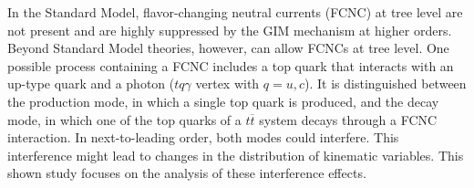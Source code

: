 \documentclass{scdpg}
\begin{document}
\begin{scAbstract}
{}
\scBeginText
In the Standard Model, flavor-changing neutral currents (FCNC) at tree level are not present and are highly suppressed by the GIM mechanism at higher orders.
Beyond Standard Model theories, however, can allow FCNCs at tree level.
One possible process containing a FCNC includes a top quark that interacts with an up-type quark and a photon ($tq\gamma$ vertex with $q=u,c$).
It is distinguished between the production mode, in which a single top quark is produced, and the decay mode, in which one of the top quarks of a $t\overline{t}$ system decays through a FCNC interaction.
In next-to-leading order, both modes could interfere.
This interference might lead to changes in the distribution of kinematic variables.
This shown study focuses on the analysis of these interference effects. 
\scEndText
{}
\scCountry{}
\end{scAbstract}
\end{document}
